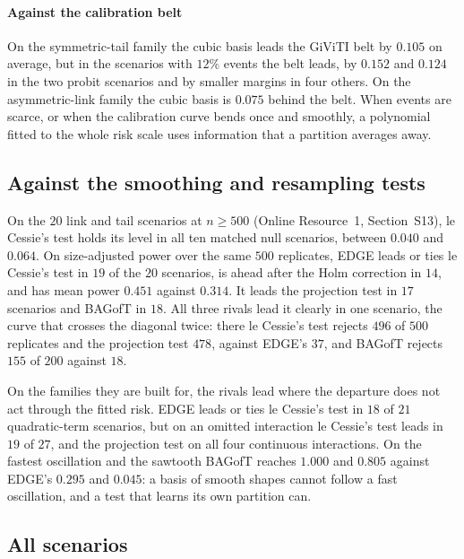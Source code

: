 \paragraph{Against the calibration belt} On the symmetric-tail family the cubic basis leads the GiViTI
belt by $0.105$ on average, but in the scenarios with $12\%$ events the belt leads, by $0.152$ and
$0.124$ in the two probit scenarios and by smaller margins in four others. On the asymmetric-link
family the cubic basis is $0.075$ behind the belt. When events are scarce, or when the calibration
curve bends once and smoothly, a polynomial fitted to the whole risk scale uses information that a
partition averages away.

\subsection{Against the smoothing and resampling tests}\label{sec:rivals}

On the $20$ link and tail scenarios at $n\ge500$ (Online Resource~1, Section~S13), le Cessie's test
holds its level in all ten matched null scenarios, between $0.040$ and $0.064$. On size-adjusted power
over the same $500$ replicates, EDGE leads or ties le Cessie's test in $19$ of the $20$ scenarios, is
ahead after the Holm correction in $14$, and has mean power $0.451$ against $0.314$. It leads the
projection test in $17$ scenarios and BAGofT in $18$. All three rivals lead it clearly in one scenario,
the curve that crosses the diagonal twice: there le Cessie's test rejects $496$ of $500$ replicates and
the projection test $478$, against EDGE's $37$, and BAGofT rejects $155$ of $200$ against $18$.

On the families they are built for, the rivals lead where the departure does not act through the
fitted risk. EDGE leads or ties le Cessie's test in $18$ of $21$ quadratic-term scenarios, but on an
omitted interaction le Cessie's test leads in $19$ of $27$, and the projection test on all four
continuous interactions. On the fastest oscillation and the sawtooth BAGofT reaches $1.000$ and $0.805$
against EDGE's $0.295$ and $0.045$: a basis of smooth shapes cannot follow a fast oscillation, and a
test that learns its own partition can.

\subsection{All scenarios}\label{sec:census}\label{sec:compute}

